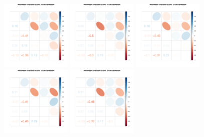 \begin{figure}[h]
\includegraphics[width=0.3\textwidth,height=0.2\textheight]{Chapters/05MCMCOU/plots/paraEvolution/corMatrix30.pdf}
\includegraphics[width=0.3\textwidth,height=0.2\textheight]{Chapters/05MCMCOU/plots/paraEvolution/corMatrix31.pdf}
\includegraphics[width=0.3\textwidth,height=0.2\textheight]{Chapters/05MCMCOU/plots/paraEvolution/corMatrix32.pdf}
\includegraphics[width=0.3\textwidth,height=0.2\textheight]{Chapters/05MCMCOU/plots/paraEvolution/corMatrix33.pdf}
\includegraphics[width=0.3\textwidth,height=0.2\textheight]{Chapters/05MCMCOU/plots/paraEvolution/corMatrix34.pdf}

\end{figure}
